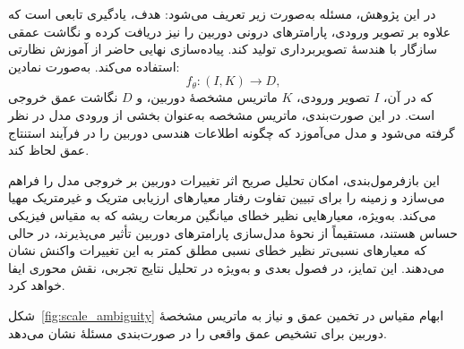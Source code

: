 در این پژوهش، مسئله به‌صورت زیر تعریف می‌شود: هدف، یادگیری تابعی است که علاوه بر تصویر ورودی، پارامترهای درونی دوربین را نیز دریافت کرده و نگاشت عمقی سازگار با هندسهٔ تصویربرداری تولید کند. پیاده‌سازی نهایی حاضر از آموزش نظارتی استفاده می‌کند. به‌صورت نمادین:
\begin{equation}
f_{\theta} : (I, K) \rightarrow D,
\end{equation}
که در آن، $I$ تصویر ورودی، $K$ ماتریس مشخصهٔ دوربین، و $D$ نگاشت عمق خروجی است. در این صورت‌بندی، ماتریس مشخصه به‌عنوان بخشی از ورودی مدل در نظر گرفته می‌شود و مدل می‌آموزد که چگونه اطلاعات هندسی دوربین را در فرآیند استنتاج عمق لحاظ کند.

این بازفرمول‌بندی، امکان تحلیل صریح اثر تغییرات دوربین بر خروجی مدل را فراهم می‌سازد و زمینه را برای تبیین تفاوت رفتار معیارهای ارزیابی متریک و غیرمتریک مهیا می‌کند. به‌ویژه، معیارهایی نظیر خطای میانگین مربعات ریشه که به مقیاس فیزیکی حساس هستند، مستقیماً از نحوهٔ مدل‌سازی پارامترهای دوربین تأثیر می‌پذیرند، در حالی که معیارهای نسبی‌تر نظیر خطای نسبی مطلق کمتر به این تغییرات واکنش نشان می‌دهند. این تمایز، در فصول بعدی و به‌ویژه در تحلیل نتایج تجربی، نقش محوری ایفا خواهد کرد.



شکل~\ref{fig:scale_ambiguity} ابهام مقیاس در تخمین عمق و نیاز به ماتریس مشخصهٔ دوربین برای تشخیص عمق واقعی را در صورت‌بندی مسئلهٔ  نشان می‌دهد.

